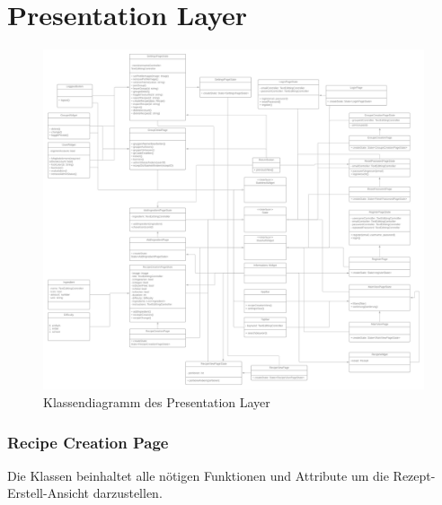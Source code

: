 \documentclass[parskip=full]{scrartcl}
\begin{document}
\section{Presentation Layer}
\begin{figure}[htp]
    \centering
    \includegraphics[width = \textwidth]{images/presentationLayer/presentationLayer.png}
    \caption{Klassendiagramm des Presentation Layer}
    \label{fig:presentation-layer}
\end{figure}

    \newpage
    \subsubsection{Recipe Creation Page}
        Die Klassen beinhaltet alle nötigen Funktionen und Attribute um die Rezept-Erstell-Ansicht darzustellen.\newline
\end{document}
